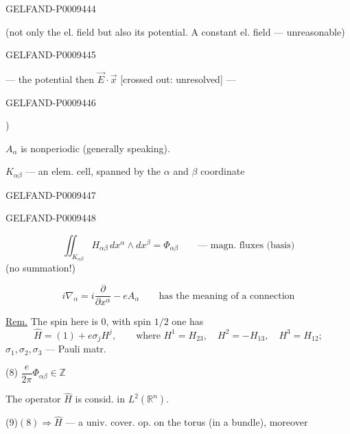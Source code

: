 \begin{GelfandAdjacentEvidence}{GELFAND-P000944}{4}


(not only the el. field but also its potential. A constant el. field --- unreasonable)
\end{GelfandAdjacentEvidence}
\begin{GelfandAdjacentEvidence}{GELFAND-P000944}{5}


--- the potential then $\vec E\cdot\vec x$ [crossed out: unresolved] ---
\end{GelfandAdjacentEvidence}
\begin{GelfandAdjacentEvidence}{GELFAND-P000944}{6}


)

$A_\alpha$ is nonperiodic (generally speaking).

$K_{\alpha\beta}$ --- an elem. cell, spanned by the $\alpha$ and $\beta$ coordinate
\end{GelfandAdjacentEvidence}
\begin{GelfandAdjacentEvidence}{GELFAND-P000944}{7}

\end{GelfandAdjacentEvidence}
\begin{GelfandAdjacentEvidence}{GELFAND-P000944}{8}


\begin{equation*}
 \iint_{K_{\alpha\beta}}H_{\alpha\beta}\,dx^\alpha\wedge dx^\beta
 =\Phi_{\alpha\beta}\qquad\text{--- magn. fluxes (basis)}
 \tag{5}
\end{equation*}
(no summation!)

\begin{equation*}
 i\nabla_\alpha=i\frac{\partial}{\partial x^\alpha}-eA_\alpha
 \qquad\text{has the meaning of a connection}
 \tag{6}
\end{equation*}

\underline{Rem.} The spin here is $0$, with spin $1/2$ one has
\begin{equation*}
 \hat H=(1)+e\sigma_jH^j,\qquad\text{where }
 H^1=H_{23},\quad H^2=-H_{13},\quad H^3=H_{12};
 \tag{7}
\end{equation*}
$\sigma_1,\sigma_2,\sigma_3$ --- Pauli matr.

(8)\quad{} \(\dfrac e{2\pi}\Phi_{\alpha\beta}\in\mathbb Z\)

The operator $\hat H$ is consid. in $L^2(\mathbb R^n)$.

(9)\quad $(8)\Rightarrow\hat H$ --- a univ. cover. op. on the torus (in a bundle), moreover
\end{GelfandAdjacentEvidence}
